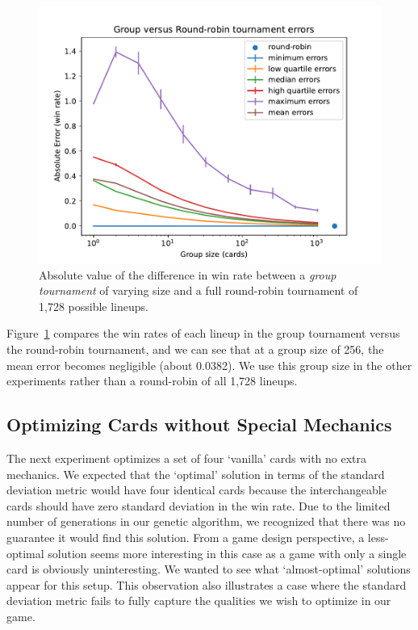 \documentclass[letterpaper]{article} %
\begin{document}
\begin{figure}[t]
	\centering
	\includegraphics[width=0.9\columnwidth]{group_vs_rr_fig}
	\caption{Absolute value of the difference in win rate between a \textit{group tournament} of varying size and a full round-robin tournament of 1,728 possible lineups. %
	}
	\label{fig:group_vs_rr}
\end{figure}


Figure~\ref{fig:group_vs_rr} compares the win rates of each lineup in the group tournament versus the round-robin tournament, and we can see that at a group size of 256, the mean error becomes negligible (about 0.0382). We use this group size in the other experiments rather than a round-robin of all 1,728 lineups.


 \subsection{Optimizing Cards without Special Mechanics}

The next experiment optimizes a set of four `vanilla' cards with no extra mechanics. We expected that the `optimal' solution in terms of the standard deviation metric would have four identical cards because the interchangeable cards should have zero standard deviation in the win rate. Due to the limited number of generations in our genetic algorithm, we recognized that there was no guarantee it would find this solution. From a game design perspective, a less-optimal solution seems more interesting in this case as a game with only a single card is obviously uninteresting. We wanted to see what `almost-optimal' solutions appear for this setup. This observation also illustrates a case where the standard deviation metric fails to fully capture the qualities we wish to optimize in our game.
\end{document}
